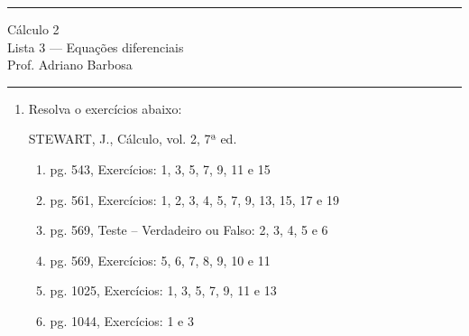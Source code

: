 \documentclass{article}
\begin{document}
\noindent{}\rule{\textwidth}{0.4pt}
\begin{center}
	C\'alculo 2\\
	Lista 3 --- Equa\c{c}\~oes diferenciais \\
	\vspace{0.2cm}
	Prof. Adriano Barbosa
\end{center}
\noindent{}\rule{\textwidth}{0.4pt}

\begin{enumerate}
\item Resolva o exerc\'icios abaixo:
	
STEWART, J., C\'alculo, vol. 2, 7ª ed.

\begin{enumerate}
	\item pg. 543, Exerc\'icios: 1, 3, 5, 7, 9, 11 e 15
	\item pg. 561, Exerc\'icios: 1, 2, 3, 4, 5, 7, 9, 13, 15, 17 e 19
	\item pg. 569, Teste -- Verdadeiro ou Falso: 2, 3, 4, 5 e 6
	\item pg. 569, Exerc\'icios: 5, 6, 7, 8, 9, 10 e 11
	\item pg. 1025, Exerc\'icios: 1, 3, 5, 7, 9, 11 e 13
	\item pg. 1044, Exerc\'icios: 1 e 3
\end{enumerate}
\end{enumerate}
\end{document}
